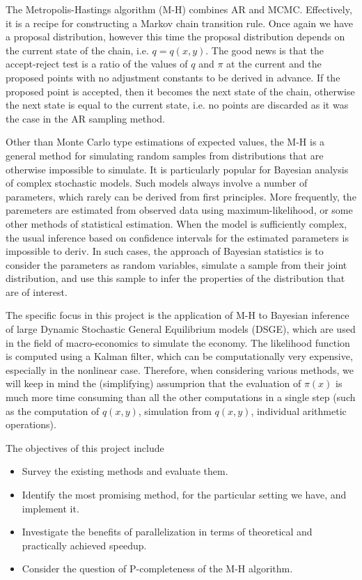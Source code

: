 \documentclass[11pt]{article}       %
\begin{document}
The Metropolis-Hastings algorithm (M-H) combines AR and MCMC.  Effectively, it
is a recipe for constructing a Markov chain transition rule.  Once again we
have a proposal distribution, however this time the proposal distribution
depends on the current state of the chain, i.e. $q=q(x,y)$. The good news is
that the accept-reject test is a ratio of the values of $q$ and $\pi$ at the
current and the proposed points with no adjustment constants to be derived in
advance.  If the proposed point is accepted, then it becomes the next state of 
the chain, otherwise the next state is equal to the current state, i.e. no 
points are discarded as it was the case in the AR sampling method.

Other than Monte Carlo type estimations of expected values, the M-H is a
general method for simulating random samples from distributions that are
otherwise impossible to simulate.  It is particularly popular for Bayesian
analysis of complex stochastic models.  Such models always involve a number of
parameters, which rarely can be derived from first principles.  More
frequently, the paremeters are estimated from observed data using
maximum-likelihood, or some other methods of statistical estimation.  When the
model is sufficiently complex, the usual inference based on confidence
intervals for the estimated parameters is impossible to deriv.  In such cases,
the approach of Bayesian statistics is to consider the parameters as random
variables,  simulate a sample from their joint distribution, and use this
sample to infer the properties of the distribution that are of interest.

The specific focus in this project is the application of M-H to Bayesian
inference of large Dynamic Stochastic General Equilibrium models (DSGE), which
are used in the field of macro-economics to simulate the economy.  The
likelihood function is computed using a Kalman filter, which can be
computationally very expensive, especially in the nonlinear case.  Therefore,
when considering various methods, we will keep in mind the (simplifying)
assumprion that the evaluation of $\pi(x)$ is much more time consuming than all
the other computations in a single step (such as the computation of $q(x,y)$,
simulation from $q(x,y)$, individual arithmetic operations). 

The objectives of this project include
\begin{itemize}
\item Survey the existing methods and evaluate them.
\item Identify the most promising method, for the particular setting we have, and implement it.
\item Investigate the benefits of parallelization in terms of theoretical and
     practically achieved speedup.
\item Consider the question of P-completeness of the M-H algorithm.
\end{itemize}
\end{document}

